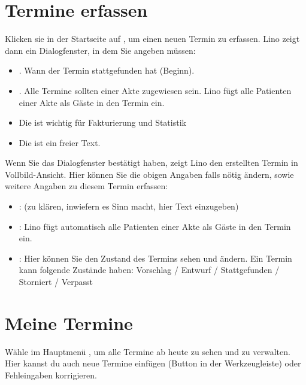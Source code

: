 \documentclass[letterpaper,10pt,ngerman]{sphinxmanual}
\begin{document}
\section{Termine erfassen}
\label{\detokenize{the/index:termine-erfassen}}
Klicken sie in der Startseite auf , um
einen neuen Termin zu erfassen. Lino zeigt dann ein Dialogfenster, in
dem Sie angeben müssen:
\begin{itemize}
\item {} 
. Wann der Termin stattgefunden hat (Beginn).

\item {} 
. Alle Termine sollten einer Akte zugewiesen sein. Lino fügt
alle Patienten einer Akte als Gäste in den Termin ein.

\item {} 
Die  ist wichtig für Fakturierung und Statistik

\item {} 
Die  ist ein freier Text.

\end{itemize}

Wenn Sie das Dialogfenster bestätigt haben, zeigt Lino den erstellten
Termin in Vollbild-Ansicht. Hier können Sie die obigen Angaben falls
nötig ändern, sowie weitere Angaben zu diesem Termin erfassen:
\begin{itemize}
\item {} 
 : (zu klären, inwiefern es Sinn macht, hier Text
einzugeben)

\item {} 
 : Lino fügt automatisch alle Patienten einer Akte als
Gäste in den Termin ein.

\item {} 
 : Hier können Sie den Zustand des Termins sehen und
ändern. Ein Termin kann folgende Zustände haben: Vorschlag / Entwurf
/ Stattgefunden / Storniert / Verpasst

\end{itemize}


\section{Meine Termine}
\label{\detokenize{the/index:meine-termine}}
Wähle im Hauptmenü , um
alle Termine ab heute zu sehen und zu verwalten.  Hier kannst du auch
neue Termine einfügen (Button  in der Werkzeugleiste) oder
Fehleingaben korrigieren.
\end{document}
